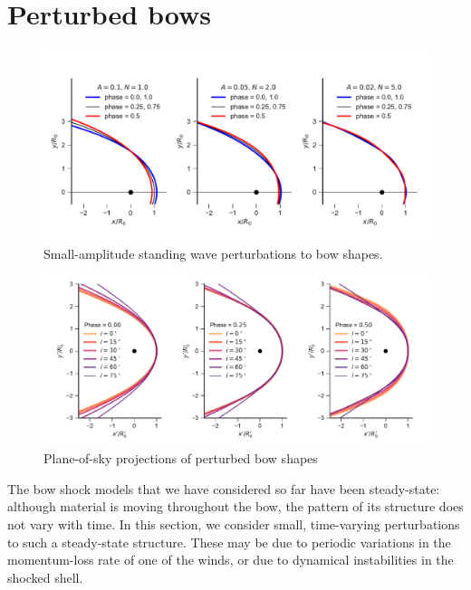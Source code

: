 \section{Perturbed bows}
\label{sec:perturbed-bows}

\begin{figure}
  \centering
  \includegraphics[width=\linewidth]{figs/compare_xyprime_wave-wilkinoid}
  \caption{Small-amplitude standing wave perturbations to bow shapes.}
  \label{fig:perturb-shapes}
\end{figure}

\begin{figure}
  \centering
  \includegraphics[width=\linewidth]
  {figs/wave_xyprime-A005-N20-ancantoid-xi080-beta000500}
  \caption{Plane-of-sky projections of perturbed bow shapes}
  \label{fig:perturb-xy-prime}
\end{figure}

The bow shock models that we have considered so far have been
steady-state: although material is moving throughout the bow, the
pattern of its structure does not vary with time.  In this section, we
consider small, time-varying perturbations to such a steady-state
structure.  These may be due to periodic variations in the
momentum-loss rate of one of the winds, or due to dynamical
instabilities in the shocked shell.

